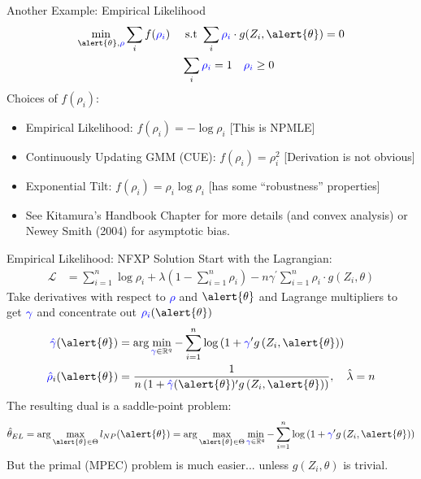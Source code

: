 \documentclass[xcolor=pdftex,dvipsnames,table,mathserif,aspectratio=169]{beamer}
\begin{document}
\begin{frame}{Another Example: Empirical Likelihood}
\begin{align*}
\min_{\alert{\theta}, \textcolor{blue}{\rho} }\sum_i f(\textcolor{blue}{\rho_i}) \quad &\text{ s.t } \sum_i \textcolor{blue}{\rho_i} \cdot g(Z_i,\alert{\theta})= 0\\
& \sum_i \textcolor{blue}{\rho_i} =1 \quad \textcolor{blue}{\rho_i} \geq 0
\end{align*}
Choices of $f(\rho_i)$:
\begin{itemize}
\item Empirical Likelihood: $f(\rho_i) = - \log \rho_i$ [This is NPMLE]
\item Continuously Updating GMM (CUE): $f(\rho_i) = \rho_i^2$ [Derivation is \alert{not} obvious]
\item Exponential Tilt: $f(\rho_i) = \rho_i \log \rho_i $ [has some ``robustness'' properties]
\item See Kitamura's Handbook Chapter for more details (and convex analysis) or Newey Smith (2004) for asymptotic bias.
\end{itemize}
\end{frame}


\begin{frame}{Empirical Likelihood: NFXP Solution}
Start with the Lagrangian:
\begin{align*}
\mathcal{L} &=\sum_{i=1}^{n} \log \rho_{i}+\lambda\left(1-\sum_{i=1}^{n} \rho_{i}\right)-n \gamma^{\prime} \sum_{i=1}^{n} \rho_{i}\cdot g\left(Z_{i}, \theta\right)
\end{align*}
Take derivatives with respect to \textcolor{blue}{$\rho$} and $\alert{\theta}$ and Lagrange multipliers to get $\textcolor{blue}{\gamma}$ and concentrate out $\textcolor{blue}{\rho_i}(\alert{\theta})$
\begin{align*}
\textcolor{blue}{\hat{\gamma}}(\alert{\theta}) &=\arg \min _{\textcolor{blue}{\gamma} \in \mathbb{R}^{q}}-
\sum_{i=1}^{n} \log \left(1+\textcolor{blue}{\gamma}^{\prime} g\left(Z_{i}, \alert{\theta}\right)\right) \\
\textcolor{blue}{\hat{\rho}}_{i}(\alert{\theta}) &=\frac{1}{n\left(1+\textcolor{blue}{\hat{\gamma}}(\alert{\theta})^{\prime} g\left(Z_{i}, \alert{\theta}\right)\right)}, \quad \hat{\lambda}=n
\end{align*}
The resulting dual is a saddle-point problem:
\begin{align*}
\hat{\theta}_{E L}=\arg \max _{\alert{\theta} \in \Theta} l_{N P}(\alert{\theta})=\arg \max _{\alert{\theta} \in \Theta} \min _{\textcolor{blue}{\gamma} \in \mathbb{R}^{q}}-\sum_{i=1}^{n} \log \left(1+\textcolor{blue}{\gamma}^{\prime} g\left(Z_{i}, \alert{\theta}\right)\right)
\end{align*}
But the primal (MPEC) problem is much easier... unless $g(Z_i,\theta)$ is trivial.
\end{frame}
\end{document}
